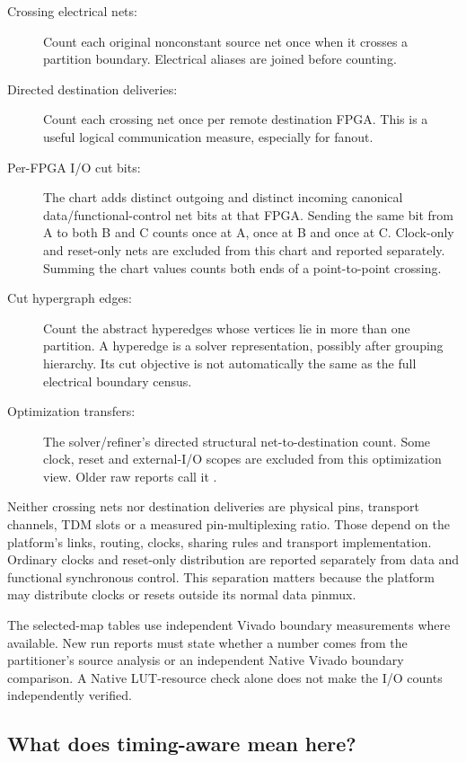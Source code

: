 \documentclass[11pt]{article}
\newcommand{\code}[1]{\texttt{\detokenize{#1}}}
\begin{document}
\begin{description}
\item[Crossing electrical nets:] Count each original nonconstant source net once when it crosses a partition boundary. Electrical aliases are joined before counting.
\item[Directed destination deliveries:] Count each crossing net once per remote destination FPGA. This is a useful logical communication measure, especially for fanout.
\item[Per-FPGA I/O cut bits:] The chart adds distinct outgoing and distinct incoming canonical data/functional-control net bits at that FPGA. Sending the same bit from A to both B and C counts once at A, once at B and once at C. Clock-only and reset-only nets are excluded from this chart and reported separately. Summing the chart values counts both ends of a point-to-point crossing.
\item[Cut hypergraph edges:] Count the abstract hyperedges whose vertices lie in more than one partition. A hyperedge is a solver representation, possibly after grouping hierarchy. Its cut objective is not automatically the same as the full electrical boundary census.
\item[Optimization transfers:] The solver/refiner's directed structural net-to-destination count. Some clock, reset and external-I/O scopes are excluded from this optimization view. Older raw reports call it \code{T}.
\end{description}
Neither crossing nets nor destination deliveries are physical pins, transport channels, TDM slots or a measured pin-multiplexing ratio. Those depend on the platform's links, routing, clocks, sharing rules and transport implementation. Ordinary clocks and reset-only distribution are reported separately from data and functional synchronous control. This separation matters because the platform may distribute clocks or resets outside its normal data pinmux.

The selected-map tables use independent Vivado boundary measurements where available. New run reports must state whether a number comes from the partitioner's source analysis or an independent Native Vivado boundary comparison. A Native LUT-resource check alone does not make the I/O counts independently verified.

\subsection{What does timing-aware mean here?}
\end{document}
